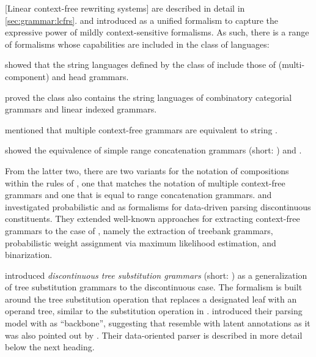 \documentclass[../document.tex]{subfiles}
\begin{document}
    [Linear context-free rewriting systems]  are described in detail in \cref{sec:grammar:lcfrs}.
     and \citet{Weir88} introduced  as a unified formalism to capture the expressive power of mildly context-sensitive formalisms.
    As such, there is a range of formalisms whose capabilities are included in the class of  languages:
    \begin{compactitem}
        \item \citet{VijWeiJos87} showed that the string languages defined by the class of  include those of (multi-component)  and head grammars.
        \item \citet{vijay1994equivalence} proved the class also contains the string languages of combinatory categorial grammars and linear indexed grammars.
        \item \citet{SekMatFujKas91} mentioned that multiple context-free grammars are equivalent to string .
        \item \citet{boullier1998proposal} showed the equivalence of simple range concatenation grammars (short: ) and .
    \end{compactitem}
    From the latter two, there are two variants for the notation of compositions within the rules of , one that matches the notation of multiple context-free grammars and one that is equal to range concatenation grammars.
     and \citet{MailKal10} investigated probabilistic  and  as formalisms for data-driven parsing discontinuous constituents.
    They extended well-known approaches for extracting context-free grammars to the case of , namely the extraction of treebank grammars, probabilistic weight assignment via maximum likelihood estimation, and binarization.

     introduced \emph{discontinuous tree substitution grammars} (short: ) as a generalization of tree substitution grammars to the discontinuous case.
    The formalism is built around the tree substitution operation that replaces a designated leaf with an operand tree, similar to the substitution operation in .
     introduced their parsing model with  as ``backbone'', suggesting that  resemble  with latent annotations as it was also pointed out by \citet[Section~8.5.1]{Geb20}.
    Their data-oriented parser is described in more detail below the next heading.
\end{document}
